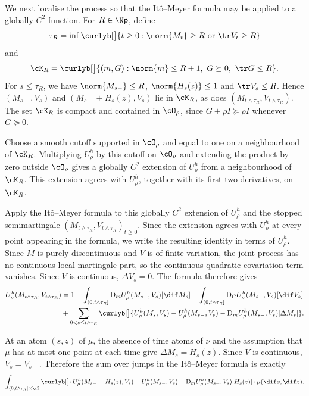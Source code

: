 \documentclass[11pt]{article}
\begin{document}
We next localise the process so that the Itô--Meyer formula may be applied to a globally $C^2$ function. For $R\in\Np$, define
\[
  \tau_R=\inf\curlyb[\big]{t\geq0:\norm{M_t}\geq R\ \text{or}\ \tr V_t\geq R}
\]
and
\[
  \cK_R=\curlyb[\big]{(m,G):\norm{m}\leq R+1,\ G\succeq0,\ \tr G\leq R}.
\]
For $s\leq\tau_R$, we have $\norm{M_{s-}}\leq R$, $\norm{H_s(z)}\leq1$ and $\tr V_s\leq R$. Hence $(M_{s-},V_s)$ and $(M_{s-}+H_s(z),V_s)$ lie in $\cK_R$, as does $(M_{t\wedge\tau_R},V_{t\wedge\tau_R})$. The set $\cK_R$ is compact and contained in $\cO_\rho$, since $G+\rho I\succeq\rho I$ whenever $G\succeq0$.

Choose a smooth cutoff supported in $\cO_\rho$ and equal to one on a neighbourhood of $\cK_R$. Multiplying $U_\rho^h$ by this cutoff on $\cO_\rho$ and extending the product by zero outside $\cO_\rho$ gives a globally $C^2$ extension of $U_\rho^h$ from a neighbourhood of $\cK_R$. This extension agrees with $U_\rho^h$, together with its first two derivatives, on $\cK_R$.

Apply the Itô--Meyer formula to this globally $C^2$ extension of $U_\rho^h$ and the stopped semimartingale $(M_{t\wedge\tau_R},V_{t\wedge\tau_R})_{t\geq0}$. Since the extension agrees with $U_\rho^h$ at every point appearing in the formula, we write the resulting identity in terms of $U_\rho^h$. Since $M$ is purely discontinuous and $V$ is of finite variation, the joint process has no continuous local-martingale part, so the continuous quadratic-covariation term vanishes. Since $V$ is continuous, $\Delta V_s=0$. The formula therefore gives
\begin{align*}
  U_\rho^h(M_{t\wedge\tau_R},V_{t\wedge\tau_R})
  &=
  1+\int_{(0,t\wedge\tau_R]}\mathrm{D}_mU_\rho^h(M_{s-},V_s)[\dif M_s]
  +\int_{(0,t\wedge\tau_R]}\mathrm{D}_GU_\rho^h(M_{s-},V_s)[\dif V_s]\\
  &+\sum_{0<s\leq t\wedge\tau_R}\curlyb[\big]{U_\rho^h(M_s,V_s)-U_\rho^h(M_{s-},V_s)-\mathrm{D}_mU_\rho^h(M_{s-},V_s)[\Delta M_s]}.
\end{align*}

At an atom $(s,z)$ of $\mu$, the absence of time atoms of $\nu$ and the assumption that $\mu$ has at most one point at each time give $\Delta M_s=H_s(z)$. Since $V$ is continuous, $V_s=V_{s-}$. Therefore the sum over jumps in the Itô--Meyer formula is exactly
\[
  \int_{(0,t\wedge\tau_R]\times\cZ}\curlyb[\big]{U_\rho^h(M_{s-}+H_s(z),V_s)-U_\rho^h(M_{s-},V_s)-\mathrm{D}_mU_\rho^h(M_{s-},V_s)[H_s(z)]}\,\mu(\dif s,\dif z).
\]
\end{document}
